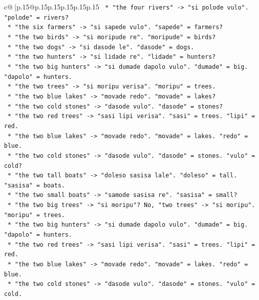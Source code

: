 \documentclass{article}
\begin{document}
{\begin{supertabular}{c@{$\;$}|p{.15\linewidth}@{}p{.15\linewidth}p{.15\linewidth}p{.15\linewidth}p{.15\linewidth}p{.15\linewidth}}
{{{\texttt{            *   "the four rivers" {-}> "si polode vulo". "polode" = rivers?} \\
\texttt{            *   "the six farmers" {-}> "si sapede vulo". "sapede" = farmers?} \\
\texttt{            *   "the two birds" {-}> "si moripude re". "moripude" = birds?} \\
\texttt{            *   "the two dogs" {-}> "si dasode le". "dasode" = dogs.} \\
\texttt{            *   "the two hunters" {-}> "si lidade re". "lidade" = hunters?} \\
\texttt{            *   "the two big hunters" {-}> "si dumade dapolo vulo". "dumade" = big. "dapolo" = hunters.} \\
\texttt{            *   "the two trees" {-}> "si moripu verisa". "moripu" = trees.} \\
\texttt{            *   "the two blue lakes" {-}> "movade redo". "movade" = lakes?} \\
\texttt{            *   "the two cold stones" {-}> "dasode vulo". "dasode" = stones?} \\
\texttt{            *   "the two red trees" {-}> "sasi lipi verisa". "sasi" = trees. "lipi" = red.} \\
\texttt{            *   "the two blue lakes" {-}> "movade redo". "movade" = lakes. "redo" = blue.} \\
\texttt{            *   "the two cold stones" {-}> "dasode vulo". "dasode" = stones. "vulo" = cold?} \\
\texttt{            *   "the two tall boats" {-}> "doleso sasisa lale". "doleso" = tall. "sasisa" = boats.} \\
\texttt{            *   "the two small boats" {-}> "samode sasisa re". "sasisa" = small?} \\
\texttt{            *   "the two big trees" {-}> "si moripu"? No, "two trees" {-}> "si moripu". "moripu" = trees.} \\
\texttt{            *   "the two big hunters" {-}> "si dumade dapolo vulo". "dumade" = big. "dapolo" = hunters.} \\
\texttt{            *   "the two red trees" {-}> "sasi lipi verisa". "sasi" = trees. "lipi" = red.} \\
\texttt{            *   "the two blue lakes" {-}> "movade redo". "movade" = lakes. "redo" = blue.} \\
\texttt{            *   "the two cold stones" {-}> "dasode vulo". "dasode" = stones. "vulo" = cold.} \\
}}}
\end{supertabular}}
\end{document}
